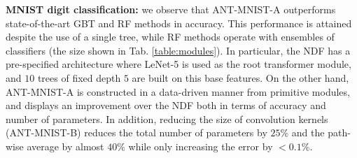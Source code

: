 

\textbf{MNIST digit classification:} we observe that ANT-MNIST-A outperforms state-of-the-art GBT \cite{ponomareva2017compact} and RF \cite{zhou2017deepft} methods in accuracy. This performance is attained despite the use of a single tree, while RF methods operate with ensembles of classifiers (the size shown in Tab. \ref{table:modules}). In particular, the NDF \cite{kontschieder2015deep} has a pre-specified architecture where LeNet-5 \cite{lecun1998gradient} is used as the root transformer module, and $10$ trees of fixed depth $5$ are built on this base features. On the other hand, ANT-MNIST-A is constructed in a data-driven manner from primitive modules, and displays an improvement over the NDF both in terms of accuracy and number of parameters. In addition, reducing the size of convolution kernels (ANT-MNIST-B) reduces the total number of parameters by $25\%$ and the path-wise average by almost $40\%$ while only increasing the error by $< 0.1\%$.

